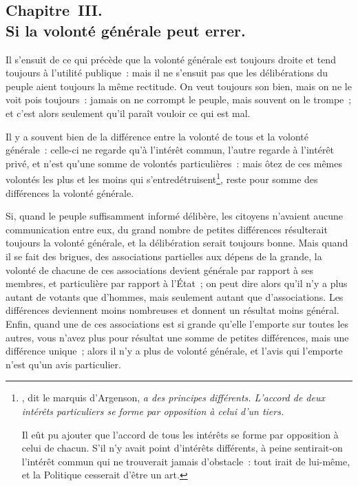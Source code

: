 \documentclass[french,twoside]{book} %
\begin{document}
\subsection[{Chapitre III. Si la volonté générale peut errer.}]{Chapitre III. \\
Si la volonté générale peut errer.}
\noindent Il s’ensuit de ce qui précède que la volonté générale est toujours droite et tend toujours à l’utilité publique : mais il ne s’ensuit pas que les délibérations du peuple aient toujours la même rectitude. On veut toujours son bien, mais on ne le voit pois toujours : jamais on ne corrompt le peuple, mais souvent on le trompe ; et c’est alors seulement qu’il paraît vouloir ce qui est mal.\par
Il y a souvent bien de la différence entre la volonté de tous et la volonté générale : celle-ci ne regarde qu’à l’intérêt commun, l’autre regarde à l’intérêt privé, et n’est qu’une somme de volontés particulières : mais ôtez de ces mêmes volontés les plus et les moins qui s’entredétruisent\footnote{ , dit le marquis d’Argenson, {\itshape a des principes différents. L’accord de deux intérêts particuliers se forme par opposition à celui d’un tiers.}\par
 Il eût pu ajouter que l’accord de tous les intérêts se forme par opposition à celui de chacun. S’il n’y avait point d’intérêts différents, à peine sentirait-on l’intérêt commun qui ne trouverait jamais d’obstacle : tout irait de lui-même, et la Politique cesserait d’être un art.
 }, reste pour somme des différences la volonté générale.\par
Si, quand le peuple suffisamment informé délibère, les citoyens n’avaient aucune communication entre eux, du grand nombre de petites différences résulterait toujours la volonté générale, et la délibération serait toujours bonne. Mais quand il se fait des brigues, des associations partielles aux dépens de la grande, la volonté de chacune de ces associations devient générale par rapport à ses membres, et particulière par rapport à l’État ; on peut dire alors qu’il n’y a plus autant de votants que d’hommes, mais seulement autant que d’associations. Les différences deviennent moins nombreuses et donnent un résultat moins général. Enfin, quand une de ces associations est si grande qu’elle l’emporte sur toutes les autres, vous n’avez plus pour résultat une somme de petites différences, mais une différence unique ; alors il n’y a plus de volonté générale, et l’avis qui l’emporte n’est qu’un avis particulier.\par
\end{document}

